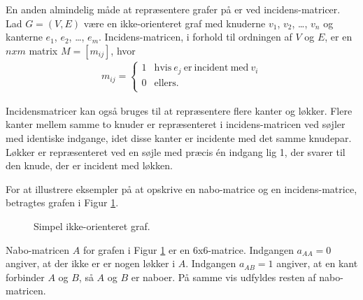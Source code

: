 \noindent En anden almindelig måde at repræsentere grafer på er ved incidens-matricer. Lad $G=(V,E)$ være en ikke-orienteret graf med knuderne $v_1$, $v_2$, \dots , $v_n$ og kanterne $e_1$, $e_2$, \dots , $e_m$. Incidens-matricen, i forhold til ordningen af $V$ og $E$, er en $n x m$ matrix $M=[m_{ij}]$, hvor 
\begin{align*}
m_{ij}= \left\{\begin{array}{cc}
1 & \textrm{hvis} \  {e_j} \  \textrm{er} \  \textrm{incident} \ \textrm{med} \ v_i \\
0 & \textrm{ellers}. \\
\end{array}\right.
\end{align*}

\noindent Incidensmatricer kan også bruges til at repræsentere flere kanter og løkker. Flere kanter mellem samme to knuder er repræsenteret i incidens-matricen ved søjler med identiske indgange, idet disse kanter er incidente med det samme knudepar. Løkker er repræsenteret ved en søjle med præcis én indgang lig 1, der svarer til den knude, der er incident med løkken.

\begin{exmp}
For at illustrere eksempler på at opskrive en nabo-matrice og en incidens-matrice, betragtes grafen i Figur \ref{fig:f1}. 
\end{exmp} 

\begin{figure}[!h]
  \centering
  \caption{Simpel ikke-orienteret graf.}
  \label{fig:f1}
\end{figure}

\noindent Nabo-matricen $A$ for grafen i Figur \ref{fig:f1} er en $6$x$6$-matrice. Indgangen $a_{AA}=0$ angiver, at der ikke er er nogen løkker i $A$. Indgangen $a_{AB}=1$ angiver, at en kant forbinder $A$ og $B$, så $A$ og $B$ er naboer. På samme vis udfyldes resten af nabo-matricen. 

